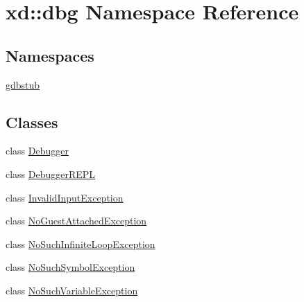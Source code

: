 \hypertarget{namespacexd_1_1dbg}{}\section{xd\+:\+:dbg Namespace Reference}
\label{namespacexd_1_1dbg}
\subsection*{Namespaces}
\begin{DoxyCompactItemize}
\item 
 \mbox{\hyperlink{namespacexd_1_1dbg_1_1gdbstub}{gdbstub}}
\end{DoxyCompactItemize}
\subsection*{Classes}
\begin{DoxyCompactItemize}
\item 
class \mbox{\hyperlink{classxd_1_1dbg_1_1_debugger}{Debugger}}
\item 
class \mbox{\hyperlink{classxd_1_1dbg_1_1_debugger_r_e_p_l}{Debugger\+R\+E\+PL}}
\item 
class \mbox{\hyperlink{classxd_1_1dbg_1_1_invalid_input_exception}{Invalid\+Input\+Exception}}
\item 
class \mbox{\hyperlink{classxd_1_1dbg_1_1_no_guest_attached_exception}{No\+Guest\+Attached\+Exception}}
\item 
class \mbox{\hyperlink{classxd_1_1dbg_1_1_no_such_infinite_loop_exception}{No\+Such\+Infinite\+Loop\+Exception}}
\item 
class \mbox{\hyperlink{classxd_1_1dbg_1_1_no_such_symbol_exception}{No\+Such\+Symbol\+Exception}}
\item 
class \mbox{\hyperlink{classxd_1_1dbg_1_1_no_such_variable_exception}{No\+Such\+Variable\+Exception}}
\end{DoxyCompactItemize}
